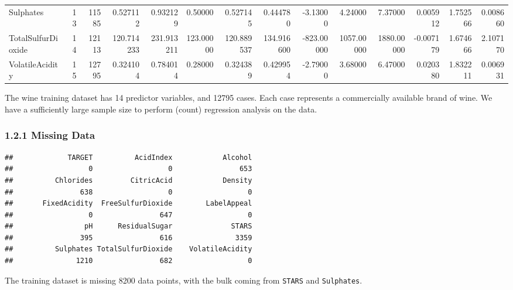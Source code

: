 \documentclass[]{article}
\begin{document}
\begin{table}[H]
{\begin{tabular}{lrrrrrrrrrrrrr}
Sulphates & 13 & 11585 & 0.527112 & 0.932129 & 0.50000 & 0.527145 & 0.444780 & -3.13000 & 4.24000 & 7.37000 & 0.005912 & 1.752566 & 0.008660\\
TotalSulfurDioxide & 14 & 12113 & 120.714233 & 231.913211 & 123.00000 & 120.889537 & 134.916600 & -823.00000 & 1057.00000 & 1880.00000 & -0.007179 & 1.674666 & 2.107170\\
VolatileAcidity & 15 & 12795 & 0.324104 & 0.784014 & 0.28000 & 0.324389 & 0.429954 & -2.79000 & 3.68000 & 6.47000 & 0.020380 & 1.832211 & 0.006931\\
\bottomrule
\end{tabular}}
\end{table}

The wine training dataset has 14 predictor variables, and 12795 cases.
Each case represents a commercially available brand of wine. We have a
sufficiently large sample size to perform (count) regression analysis on
the data.

\hypertarget{missing-data}{%
\subsubsection{1.2.1 Missing Data}\label{missing-data}}

\begin{verbatim}
##             TARGET          AcidIndex            Alcohol 
##                  0                  0                653 
##          Chlorides         CitricAcid            Density 
##                638                  0                  0 
##       FixedAcidity  FreeSulfurDioxide        LabelAppeal 
##                  0                647                  0 
##                 pH      ResidualSugar              STARS 
##                395                616               3359 
##          Sulphates TotalSulfurDioxide    VolatileAcidity 
##               1210                682                  0
\end{verbatim}

The training dataset is missing 8200 data points, with the bulk coming
from \texttt{STARS} and \texttt{Sulphates}.
\end{document}

